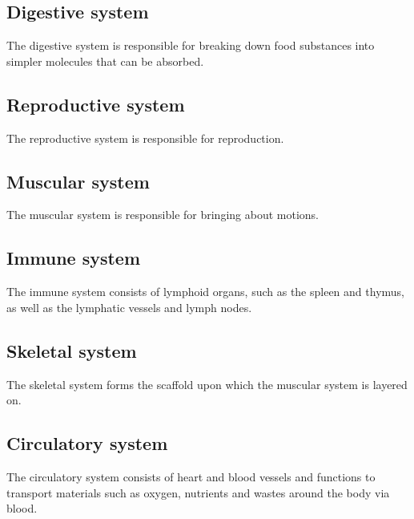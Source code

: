 \documentclass[11pt]{article}
\begin{document}
\subsection{Digestive system}
\label{sec:org6d64db5}
The digestive system is responsible for breaking down food substances into simpler molecules that can be absorbed.

\subsection{Reproductive system}
\label{sec:orga868500}
The reproductive system is responsible for reproduction.

\subsection{Muscular system}
\label{sec:orgac0cc0e}
The muscular system is responsible for bringing about motions.

\subsection{Immune system}
\label{sec:orgb9b2ad8}
The immune system consists of lymphoid organs, such as the spleen and thymus, as well as the lymphatic vessels and lymph nodes.

\subsection{Skeletal system}
\label{sec:org01d6c35}
The skeletal system forms the scaffold upon which the muscular system is layered on.

\subsection{Circulatory system}
\label{sec:org82f6b68}
The circulatory system consists of heart and blood vessels and functions to transport materials such as oxygen, nutrients and wastes around the body via blood.
\end{document}
